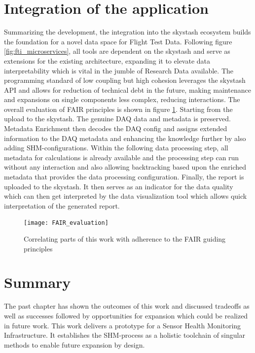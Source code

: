 \section{Integration of the application}

Summarizing the development, the integration into the skystash ecosystem builds the foundation for a novel data space for Flight Test Data. Following figure \ref{fig:fti_microservices}, all tools are dependent on the skystash and serve as extensions for the existing architecture, expanding it to elevate data interpretability which is vital in the jumble of Research Data available. The programming standard of low coupling but high cohesion \cite{stevens_structured_1974} leverages the skystash API and allows for reduction of technical debt in the future, making maintenance and expansions on single components less complex, reducing interactions.
The overall evaluation of FAIR principles is shown in figure \ref{fig:FAIR_evaluation}. Starting from the upload to the skystash. The genuine DAQ data and metadata is preserved. Metadata Enrichment then decodes the DAQ config and assigns extended information to the DAQ metadata and enhancing the knowledge further by also adding SHM-configurations. Within the following data processing step, all metadata for calculations is already available and the processing step can run without any interaction and also allowing backtracking based upon the enriched metadata that provides the data processing configuration. Finally, the report is uploaded to the skystash. It then serves as an indicator for the data quality which can then get interpreted by the data visualization tool which allows quick interpretation of the generated report.


\begin{figure}
    \centering
    \texttt{[image: FAIR\_evaluation]}
    \caption{Correlating parts of this work with adherence to the FAIR guiding principles}
    \label{fig:FAIR_evaluation}
\end{figure}

\section{Summary}
The past chapter has shown the outcomes of this work and discussed tradeoffs as well as successes followed by opportunities for expansion which could be realized in future work.
This work delivers a prototype for a Sensor Health Monitoring Infrastructure. It establishes the SHM-process as a holistic toolchain of singular methods to enable future expansion by design.



